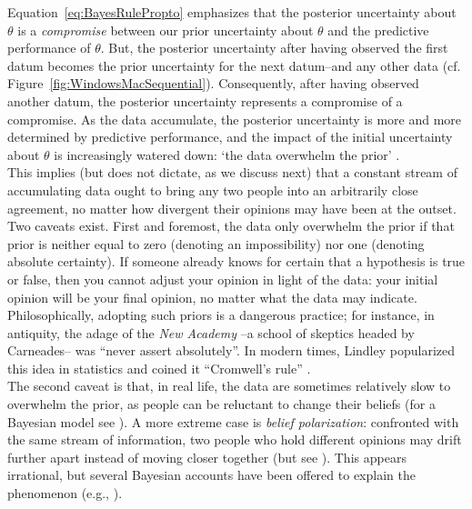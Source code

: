 \documentclass[man, floatsintext]{apa7} %
\begin{document}
Equation~\ref{eq:BayesRulePropto} emphasizes that the posterior uncertainty about $\theta$ is a \emph{compromise} between our prior uncertainty about $\theta$ and the predictive performance of $\theta$. But, the posterior uncertainty after having observed the first datum becomes the prior uncertainty for the next datum--and any other data (cf. Figure~\ref{fig:WindowsMacSequential}). Consequently, after having observed another datum, the posterior uncertainty represents a compromise of a compromise. As the data accumulate, the posterior uncertainty is more and more determined by predictive performance, and the impact of the initial uncertainty about $\theta$ is increasingly watered down: `the data overwhelm the prior' \parencite{WrinchJeffreys1919}. \\

This implies (but does not dictate, as we discuss next) that a constant stream of accumulating data ought to bring any two people into an arbitrarily close agreement, no matter how divergent their opinions may have been at the outset. Two caveats exist. First and foremost, the data only overwhelm the prior if that prior is neither equal to zero (denoting an impossibility) nor one (denoting absolute certainty). If someone already knows for certain that a hypothesis is true or false, then you cannot adjust your opinion in light of the data: your initial opinion will be your final opinion, no matter what the data may indicate. Philosophically, adopting such priors is a dangerous practice; for instance, in antiquity, the adage of the \emph{New Academy} --a school of skeptics headed by Carneades-- was ``never assert absolutely''. In modern times, Lindley popularized this idea in statistics and coined it ``Cromwell's rule'' \parencite[p. 104]{Lindley1985}. \\

The second caveat is that, in real life, the data are sometimes relatively slow to overwhelm the prior, as people can be reluctant to change their beliefs (for a Bayesian model see \cite{Gershman2019}). A more extreme case is \emph{belief polarization}: confronted with the same stream of information, two people who hold different opinions may drift further apart instead of moving closer together (but see \cite{Anglin2019}). This appears irrational, but several Bayesian accounts have been offered to explain the phenomenon (e.g., \cite{CookLewandowsky2016,JernEtAl2014}). \\
\end{document}
